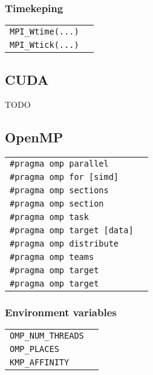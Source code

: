 \documentclass[11pt]{article}
\begin{document}
\begin{tabular}{ p{7cm} l }
\end{tabular}

\subsubsection{Timekeping}

\begin{tabular}{ p{7cm} l }
	\lstinline$MPI_Wtime(...)$ & \\
	\lstinline$MPI_Wtick(...)$ & \\
\end{tabular}

\subsection{CUDA}

TODO

\subsection{OpenMP}

\begin{tabular}{ p{7cm} l }
	\lstinline$#pragma omp parallel$ & \\
	\lstinline$#pragma omp for [simd]$ & \\
	\lstinline$#pragma omp sections$ & \\
	\lstinline$#pragma omp section$ & \\
	\lstinline$#pragma omp task$ & \\
	\lstinline$#pragma omp target [data]$ & \\
	\lstinline$#pragma omp distribute$ & \\
	\lstinline$#pragma omp teams$ & \\ 
	\lstinline$#pragma omp target$ & \\
	\lstinline$#pragma omp target$ & \\
\end{tabular}

\subsubsection{Environment variables}

\begin{tabular}{ p{7cm} l }
	\lstinline$OMP_NUM_THREADS$ & \\
	\lstinline$OMP_PLACES$ & \\
	\lstinline$KMP_AFFINITY$ & \\
\end{tabular}
\end{document}
